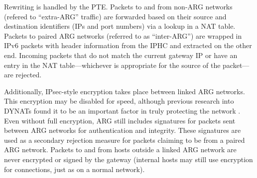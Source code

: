 \par Rewriting  is handled by the \ac{PTE}. Packets to and from non-\ac{ARG} networks (refered to ``extra-ARG''  traffic) are forwarded based on their source and destination identifiers (\acp{IP} and port numbers) via a lookup in a \ac{NAT} table. Packets to paired \ac{ARG} networks (referred to as ``inter-ARG'') are wrapped in \ac{IPv6} packets with header information from the \ac{IPHC} and extracted on the other end. Incoming packets that do not match the current gateway \ac{IP} or have an entry in the \ac{NAT} table---whichever is appropriate for the source of the packet---are rejected.


\par Additionally, \ac{IPsec}-style encryption takes place between linked \ac{ARG} networks. This encryption may be disabled for speed, although previous research into \acp{DYNAT} found it to be an important factor in truly protecting the network \cite{BBNDYNAT, NAH}. Even without full encryption, \ac{ARG} still includes signatures for packets sent between \ac{ARG} networks for authentication and integrity. These signatures are used as a secondary rejection measure for packets claiming to be from a paired \ac{ARG} network. Packets to and from hosts outside a linked \ac{ARG} network are never encrypted or signed by the gateway (internal hosts may still use encryption for connections, just as on a normal network).


